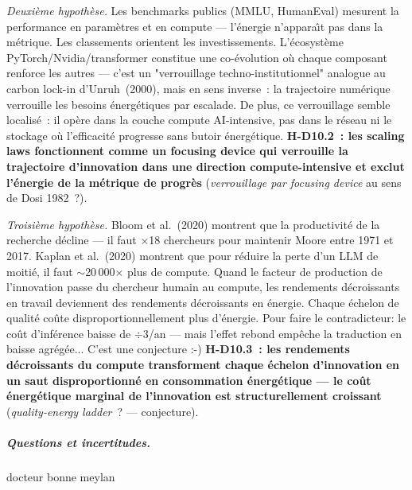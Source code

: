 \emph{Deuxi\`eme hypoth\`ese.} Les benchmarks publics (MMLU, HumanEval) mesurent la performance en param\`etres et en compute --- l'\'energie n'appara\^{\i}t pas dans la m\'etrique. Les classements orientent les investissements. L'\'ecosyst\`eme PyTorch/Nvidia/transformer constitue une co-\'evolution o\`u chaque composant renforce les autres --- c'est un "verrouillage techno-institutionnel" analogue au carbon lock-in d'Unruh~(2000), mais en sens inverse~: la trajectoire num\'erique verrouille les besoins \'energ\'etiques par escalade. De plus, ce verrouillage semble localis\'e~: il op\`ere dans la couche compute AI-intensive, pas dans le r\'eseau ni le stockage o\`u l'efficacit\'e progresse sans butoir \'energ\'etique. \textbf{H-D10.2~: les scaling laws fonctionnent comme un focusing device qui verrouille la trajectoire d'innovation dans une direction compute-intensive et exclut l'\'energie de la m\'etrique de progr\`es} (\emph{verrouillage par focusing device} au sens de Dosi 1982~?).

\emph{Troisi\`eme hypoth\`ese.} Bloom et al.~(2020) montrent que la productivit\'e de la recherche d\'ecline --- il faut $\times$18 chercheurs pour maintenir Moore entre 1971 et 2017. Kaplan et al.~(2020) montrent que pour r\'eduire la perte d'un LLM de moiti\'e, il faut $\sim$20\,000$\times$ plus de compute. Quand le facteur de production de l'innovation passe du chercheur humain au compute, les rendements d\'ecroissants en travail deviennent des rendements d\'ecroissants en \'energie. Chaque \'echelon de qualit\'e co\^ute disproportionnellement plus d'\'energie. Pour faire le contradicteur: le co\^ut d'inf\'erence baisse de $\div$3/an --- mais l'effet rebond emp\^eche la traduction en baisse agr\'eg\'ee... C'est une conjecture :-) \textbf{H-D10.3~: les rendements d\'ecroissants du compute transforment chaque \'echelon d'innovation en un saut disproportionn\'e en consommation \'energ\'etique --- le co\^ut \'energ\'etique marginal de l'innovation est structurellement croissant} (\emph{quality-energy ladder}~? --- conjecture).

\subparagraph{Questions et incertitudes.}
\begin{itemize}docteur bonne meylan
\end{itemize}



\clearpage

